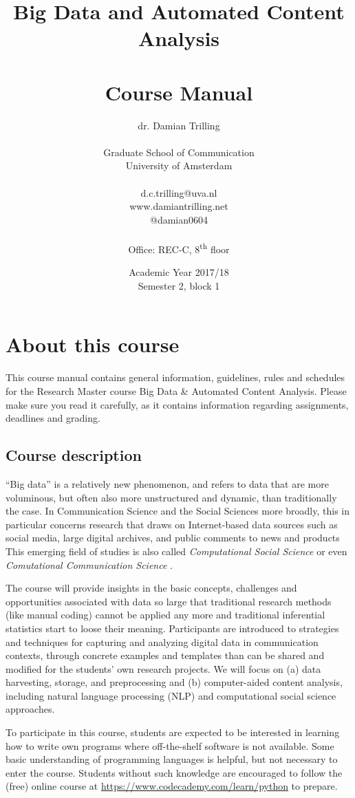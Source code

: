 \documentclass[a4paper,10pt]{report}
\title{Big Data and Automated Content Analysis\\~\\Course Manual}
\author{dr. Damian Trilling\\~\\Graduate School of Communication\\University of Amsterdam\\~\\d.c.trilling@uva.nl\\www.damiantrilling.net\\@damian0604\\~\\Office: REC-C, 8\textsuperscript{th} floor}
\date{Academic Year 2017/18\\Semester 2, block 1}
\begin{document}
\maketitle



\chapter{About this course}

This course manual contains general information, guidelines, rules and schedules for the Research Master course Big Data \& Automated Content Analysis. Please make sure you read it carefully, as it  contains information regarding assignments, deadlines and grading.

\section{Course description}
 
``Big data'' is a relatively new phenomenon, and refers to data that are more voluminous, but often also more unstructured and dynamic, than traditionally the case. In Communication Science and the Social Sciences more broadly, this in particular concerns research that draws on Internet-based data sources such as social media, large digital archives, and public comments to news and products This emerging field of studies is also called \emph{Computational Social Science} \citep{Lazer2009} or even \emph{Comutational Communication Science} \citep{Shah2015}.


The course will provide insights in the basic concepts, challenges and opportunities associated with data so large that traditional research methods (like manual coding) cannot be applied any more and traditional inferential statistics start to loose their meaning. Participants are introduced to strategies and techniques for capturing and analyzing digital data in communication contexts, through concrete examples and templates than can be shared and modified for the students’ own research projects. We will focus on (a) data harvesting, storage, and preprocessing and (b) computer-aided content analysis, including natural language processing (NLP) and computational social science approaches.

To participate in this course, students are expected to be interested in learning how to write own programs where off-the-shelf software is not available. Some basic understanding of programming languages is helpful, but not necessary to enter the course. Students without such knowledge are encouraged to follow the (free) online course at \url{https://www.codecademy.com/learn/python} to prepare.
\end{document}
